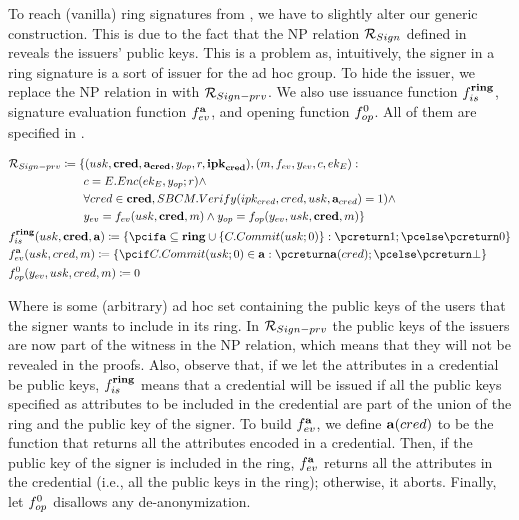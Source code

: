 To reach (vanilla) ring signatures from \UAS, we have to slightly alter our
generic construction. This is due to the fact that the NP relation
$\mathcal{R}_{Sign}$ defined in  reveals the
issuers' public keys. This is a problem as, intuitively, the signer in a ring
signature is a sort of issuer for the ad hoc group. To hide the issuer, we
replace the NP relation in  with
$\mathcal{R}_{Sign-prv}$. We also use issuance function $f_{is}^{\mathbf{ring}}$,
signature evaluation function $f_{ev}^{\mathbf{a}}$, and opening function
$f_{op}^0$. All of them are specified in .

\begin{align}
  & \NIZKRel_{\Sign-prv} \coloneqq \lbrace (\usk,\scred,\attrs_{\scred},\yinsp,r,
    \sipk_{\scred}),(\msg,\feval,\yeval,\Ec,\Eek): \nonumber \\
  & \hspace*{6.405em}\Ec = \EEnc(\Eek,\yinsp;r) \land \nonumber \\
  & \hspace*{6.40em}\forall \cred \in \scred,\SBCMVerify(\ipk_{\cred},\cred,\usk,
    \attrs_{\cred}) = 1) \land \nonumber \\
  & \hspace*{6.40em}\yeval = \feval(\usk,\scred,\msg) \land
    \yinsp = \finsp(\yeval,\usk,\scred,\msg)
     \rbrace \nonumber \\
  & \fissue^{\sring}(\usk,\scred,\attrs) \coloneqq \lbrace \pcif \attrs
    \subseteq \sring \cup \lbrace \CCommit(\usk;0) \rbrace: \pcreturn 1; \pcelse
    \pcreturn 0 \rbrace \nonumber \\
  & \feval^{\attrs}(\usk,\cred,\msg) \coloneqq \lbrace \pcif \CCommit(\usk;0) \in
    \attrs: \pcreturn \attrs(\cred); \pcelse \pcreturn \bot \rbrace \nonumber \\
  & \finsp^0(\yeval,\usk,\cred,\msg) \coloneqq 0 \label{eq:uas-ring-funcs}
\end{align}

Where \sring is some (arbitrary) ad hoc set containing the public keys of the
users that the signer wants to include in its ring. In $\mathcal{R}_{Sign-prv}$
the public keys of the issuers are now part of the witness in the NP relation,
which means that they will not be revealed in the proofs. Also, observe that, if
we let the attributes in a credential be public keys, $f_{is}^{\mathbf{ring}}$ means
that a credential will be issued if all the public keys specified as attributes
to be included in the credential are part of the union of the ring and the
public key of the signer. To build $f_{ev}^{\mathbf{a}}$, we define $\mathbf{a}(cred)$
to be the function that returns all the attributes encoded in a credential.
Then, if the public key of the signer is included in the ring, $f_{ev}^{\mathbf{a}}$
returns all the attributes in the credential (i.e., all the public keys in the
ring); otherwise, it aborts. Finally, let $f_{op}^0$ disallows any
de-anonymization.

